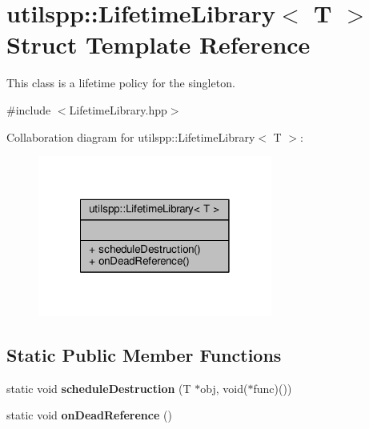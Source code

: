 \hypertarget{structutilspp_1_1LifetimeLibrary}{\section{utilspp\-:\-:Lifetime\-Library$<$ T $>$ Struct Template Reference}
\label{structutilspp_1_1LifetimeLibrary}
}


This class is a lifetime policy for the singleton.  




{\ttfamily \#include $<$Lifetime\-Library.\-hpp$>$}



Collaboration diagram for utilspp\-:\-:Lifetime\-Library$<$ T $>$\-:
\nopagebreak
\begin{figure}[H]
\begin{center}
\leavevmode
\includegraphics[width=218pt]{structutilspp_1_1LifetimeLibrary__coll__graph}
\end{center}
\end{figure}
\subsection*{Static Public Member Functions}
\begin{DoxyCompactItemize}
\item 
\hypertarget{structutilspp_1_1LifetimeLibrary_a7af7f33cb35f12ebccc192717ade7720}{static void {\bfseries schedule\-Destruction} (T $\ast$obj, void($\ast$func)())}\label{structutilspp_1_1LifetimeLibrary_a7af7f33cb35f12ebccc192717ade7720}

\item 
\hypertarget{structutilspp_1_1LifetimeLibrary_a3504154dda979768ed0c81dc4bf5d54e}{static void {\bfseries on\-Dead\-Reference} ()}\label{structutilspp_1_1LifetimeLibrary_a3504154dda979768ed0c81dc4bf5d54e}

\end{DoxyCompactItemize}


